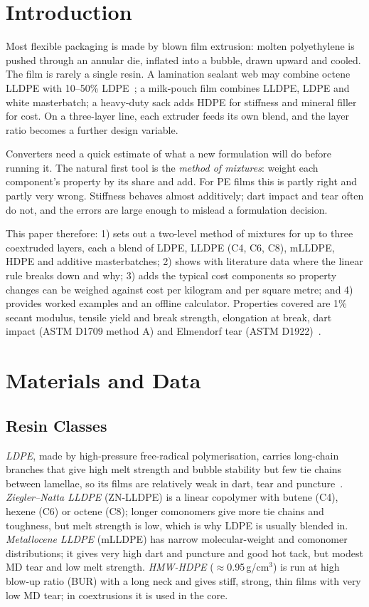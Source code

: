 \documentclass[conference,a4paper]{IEEEtran}
\begin{document}
\section{Introduction}
Most flexible packaging is made by blown film extrusion: molten polyethylene is pushed through an annular die, inflated into a bubble, drawn upward and cooled. The film is rarely a single resin. A lamination sealant web may combine octene LLDPE with 10--50\% LDPE~\cite{savar}; a milk-pouch film combines LLDPE, LDPE and white masterbatch; a heavy-duty sack adds HDPE for stiffness and mineral filler for cost. On a three-layer line, each extruder feeds its own blend, and the layer ratio becomes a further design variable.

Converters need a quick estimate of what a new formulation will do before running it. The natural first tool is the \emph{method of mixtures}: weight each component's property by its share and add. For PE films this is partly right and partly very wrong. Stiffness behaves almost additively; dart impact and tear often do not, and the errors are large enough to mislead a formulation decision.

This paper therefore: 1) sets out a two-level method of mixtures for up to three coextruded layers, each a blend of LDPE, LLDPE (C4, C6, C8), mLLDPE, HDPE and additive masterbatches; 2) shows with literature data where the linear rule breaks down and why; 3) adds the typical cost components so property changes can be weighed against cost per kilogram and per square metre; and 4) provides worked examples and an offline calculator. Properties covered are 1\% secant modulus, tensile yield and break strength, elongation at break, dart impact (ASTM D1709 method A) and Elmendorf tear (ASTM D1922)~\cite{astm}.

\section{Materials and Data}
\subsection{Resin Classes}
\emph{LDPE}, made by high-pressure free-radical polymerisation, carries long-chain branches that give high melt strength and bubble stability but few tie chains between lamellae, so its films are relatively weak in dart, tear and puncture~\cite{jpfs}. \emph{Ziegler--Natta LLDPE} (ZN-LLDPE) is a linear copolymer with butene (C4), hexene (C6) or octene (C8); longer comonomers give more tie chains and toughness, but melt strength is low, which is why LDPE is usually blended in. \emph{Metallocene LLDPE} (mLLDPE) has narrow molecular-weight and comonomer distributions; it gives very high dart and puncture and good hot tack, but modest MD tear and low melt strength. \emph{HMW-HDPE} ($\approx$0.95\,g/cm$^3$) is run at high blow-up ratio (BUR) with a long neck and gives stiff, strong, thin films with very low MD tear; in coextrusions it is used in the core.
\end{document}
